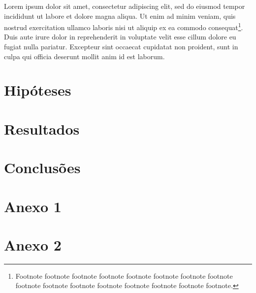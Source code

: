 \documentclass[Ingles]{feec-tese-v1}
\begin{document}
Lorem ipsum dolor sit amet, consectetur adipiscing elit, sed do eiusmod
tempor incididunt ut labore et dolore magna aliqua. Ut enim ad minim
veniam, quis nostrud exercitation ullamco laboris nisi ut aliquip ex ea
commodo consequat\footnote{Footnote footnote footnote footnote footnote
  footnote footnote footnote footnote footnote footnote footnote footnote
  footnote footnote footnote.}.  Duis aute irure dolor in reprehenderit in
voluptate velit esse cillum dolore eu fugiat nulla pariatur. Excepteur sint
occaecat cupidatat non proident, sunt in culpa qui officia deserunt mollit
anim id est laborum.


\chapter{Hipóteses}


\chapter{Resultados}


\chapter{Conclusões}



\printbibliography


\appendix
\chapter{Anexo 1}
\chapter{Anexo 2}
\end{document}
